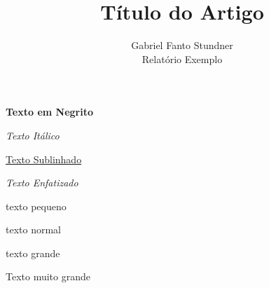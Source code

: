 \documentclass[12pt,brazil,a4paper]{article}
\begin{document}
\title{Título do Artigo}
\author{Gabriel Fanto Stundner \\ Relatório Exemplo}
\maketitle


\textbf{Texto em Negrito}

\textit{Texto Itálico}

\underline{Texto Sublinhado}

\emph{Texto Enfatizado}


{\tiny texto pequeno}

{\normalsize texto normal}

{\large texto grande}

{\huge Texto muito grande}
\end{document}
